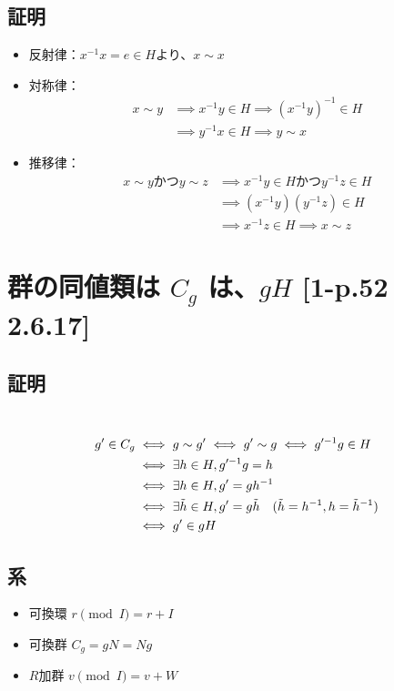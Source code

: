 \documentclass[twocolumn]{jsarticle}
\newcommand{\inv}[1]{#1^{-1}}
\begin{document}
\subsection{証明}
\begin{itemize}
    \item 反射律：\(\inv{x}x=e\in H\)より、\(x\sim x\)
    \item 対称律：
    \begin{align*}
        x\sim y &\implies \inv{x}y \in H \implies \inv{(\inv{x}y)} \in H \\
        &\implies \inv{y}x \in H \implies y \sim x
    \end{align*} 
    \item 推移律：
    \begin{align*}
        x\sim y かつ y \sim z &\implies \inv{x}y \in H かつ \inv{y}z \in H \\
        &\implies (\inv{x}y)(\inv{y}z) \in H \\
        &\implies \inv{x}z \in H \implies x \sim z
    \end{align*} 
\end{itemize}

\section{群の同値類は \(C_g\) は、\(gH\) [1-p.52 2.6.17]}
\subsection{証明}
\;\\[-12mm]
\begin{align*}
g' \in C_g
&\iff g \sim g' \iff g' \sim g \iff \inv{g'}g \in H \\
&\iff \exists h \in H, \inv{g'}g = h \\
&\iff \exists h \in H, g' = g\inv{h} \\
&\iff \exists \Tilde{h} \in H, g' = g\Tilde{h} \quad(\Tilde{h}=\inv{h}, h = \inv{\Tilde{h}})\\
&\iff g' \in gH
\end{align*}
\subsection{系}
\begin{itemize}
    \item 可換環 \(r\pmod I = r+I\)
    \item 可換群 \(C_g = gN = Ng\)
    \item \(R\)加群 \(v\pmod I = v+W\)
\end{itemize}
\newpage
\end{document}
